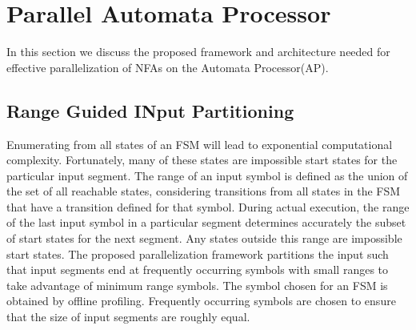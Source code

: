 \section{\textbf{Parallel Automata Processor}}
In this section we discuss the proposed framework and architecture \cite{1} needed for effective parallelization of NFAs on the Automata Processor(AP).

\subsection{Range Guided INput Partitioning}
Enumerating from all states of an FSM will lead to exponential
computational complexity. Fortunately, many of these states are impossible start states for the particular input segment. The range of
an input symbol is defined as the union of the set of all reachable
states, considering transitions from all states in the FSM that have
a transition defined for that symbol. During actual execution, the
range of the last input symbol in a particular segment determines
accurately the subset of start states for the next segment. Any states
outside this range are impossible start states. The proposed parallelization framework \cite{1} partitions the input such that input segments
end at frequently occurring symbols with small ranges to take advantage of minimum range symbols. The symbol chosen for an FSM
is obtained by offline profiling. Frequently occurring symbols are
chosen to ensure that the size of input segments are roughly equal.

